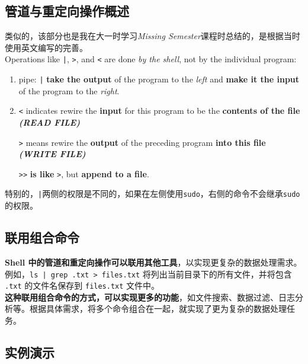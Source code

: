 \subsection{管道与重定向操作概述}

类似的，该部分也是我在大一时学习\textit{Missing Semester}课程时总结的，是根据当时使用英文编写的完善。\\

Operations like \texttt{|}, \texttt{>}, and \texttt{<} are done \textit{by the shell}, not by the individual program:

\begin{enumerate}

    \item pipe: \texttt{|} \textbf{take the output} of the program to the \textit{left} and \textbf{make it the input} of the program to the \textit{right}.

    \item \texttt{<} indicates rewire the \textbf{input} for this program to be the \textbf{contents of the file \textit{(READ FILE)}}
    
        \texttt{>} means rewire the \textbf{output} of the preceding program \textbf{into this file \textit{(WRITE FILE)}}

        \texttt{>>} \textbf{is like} \texttt{>}, but \textbf{append to a file}.

\end{enumerate}

特别的，\texttt{|}两侧的权限是不同的，如果在左侧使用\texttt{sudo}，右侧的命令不会继承\texttt{sudo}的权限。

\subsection{联用组合命令}

\textbf{Shell 中的管道和重定向操作可以联用其他工具}，以实现更复杂的数据处理需求。例如，\texttt{ls | grep .txt > files.txt} 将列出当前目录下的所有文件，并将包含 \texttt{.txt} 的文件名保存到 \texttt{files.txt} 文件中。\\

\textbf{这种联用组合命令的方式，可以实现更多的功能}，如文件搜索、数据过滤、日志分析等。根据具体需求，将多个命令组合在一起，就实现了更为复杂的数据处理任务。

\subsection{实例演示}

